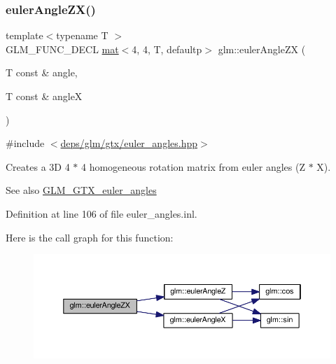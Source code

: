\subsubsection{\texorpdfstring{euler\+Angle\+Z\+X()}{eulerAngleZX()}}
{\footnotesize\ttfamily template$<$typename T $>$ \\
G\+L\+M\+\_\+\+F\+U\+N\+C\+\_\+\+D\+E\+CL \hyperlink{structglm_1_1mat}{mat}$<$4, 4, T, defaultp$>$ glm\+::euler\+Angle\+ZX (\begin{DoxyParamCaption}\item[{T const \&}]{angle,  }\item[{T const \&}]{angleX }\end{DoxyParamCaption})}



{\ttfamily \#include $<$\hyperlink{euler__angles_8hpp}{deps/glm/gtx/euler\+\_\+angles.\+hpp}$>$}

Creates a 3D 4 $\ast$ 4 homogeneous rotation matrix from euler angles (Z $\ast$ X). \begin{DoxySeeAlso}{See also}
\hyperlink{group__gtx__euler__angles}{G\+L\+M\+\_\+\+G\+T\+X\+\_\+euler\+\_\+angles} 
\end{DoxySeeAlso}


Definition at line 106 of file euler\+\_\+angles.\+inl.

Here is the call graph for this function\+:
\nopagebreak
\begin{figure}[H]
\begin{center}
\leavevmode
\includegraphics[width=350pt]{d2/d7e/group__gtx__euler__angles_ga483903115cd4059228961046a28d69b5_cgraph}
\end{center}
\end{figure}
\mbox{\label{group__gtx__euler__angles_ga400b2bd5984999efab663f3a68e1d020}} 
